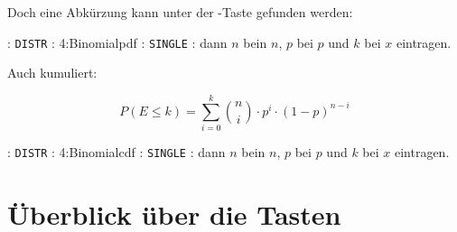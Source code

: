 Doch eine Abkürzung kann unter der -Taste gefunden werden:

: \texttt{DISTR} :  4:Binomialpdf :
\texttt{SINGLE} : dann $n$ bein $n$, $p$ bei $p$ und $k$ bei $x$ eintragen.

Auch kumuliert:

 $$P(E \le k) = \sum_{i=0}^{k}{n \choose i}\cdot{}p^i\cdot{}(1-p)^{n-i}$$

: \texttt{DISTR} :  4:Binomialcdf :
\texttt{SINGLE} : dann $n$ bein $n$, $p$ bei $p$ und $k$ bei $x$ eintragen.

     


\newpage


\section*{Überblick über die Tasten}

